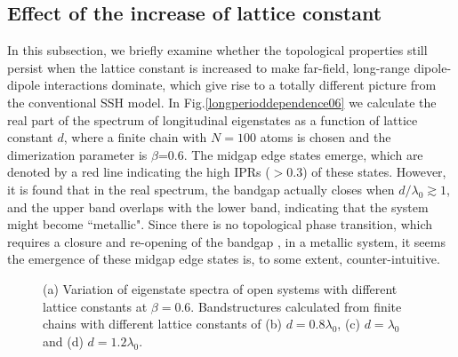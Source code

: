 \documentclass[aps,pra,reprint,groupedaddress,nofootinbib,longbibliography,showpacs]{revtex4-1}
\begin{document}
\subsection{Effect of the increase of lattice constant}
In this subsection, we briefly examine whether the topological properties still persist when the lattice constant is increased to make far-field, long-range dipole-dipole interactions dominate, which give rise to a totally different picture from the conventional SSH model. In Fig.\ref{longperioddependence06} we calculate the real part of the spectrum of longitudinal eigenstates as a function of lattice constant $d$, where a finite chain with $N=100$ atoms is chosen and the dimerization parameter is $\beta$=0.6. The midgap edge states emerge, which are denoted by a red line indicating the high IPRs ($>0.3$) of these states. However, it is found that in the real spectrum, the bandgap actually closes when $d/\lambda_0\gtrsim1$, and the upper band overlaps with the lower band, indicating that the system might become ``metallic".  Since there is no topological phase transition, which requires a closure and re-opening of the bandgap \cite{krausPRL2012}, in a metallic system, it seems the emergence of these midgap edge states is, to some extent, counter-intuitive. 

\begin{figure}[htbp]
	\centering
	\hspace{0.01in}
	\hspace{0.01in}
	\hspace{0.01in}
	\caption{ (a) Variation of eigenstate spectra of open systems with different lattice constants at $\beta=0.6$. Bandstructures calculated from finite chains with different lattice constants of (b) $d=0.8\lambda_0$, (c) $d=\lambda_0$ and (d) $d=1.2\lambda_0$.}\label{longband}
\end{figure}
\end{document}
